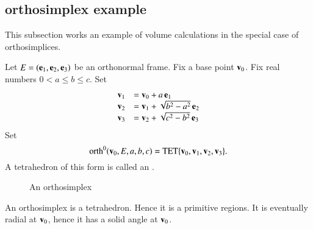 %
%
%



\subsection{orthosimplex example}
%

This subsection works an example of volume calculations in the special
case of orthosimplices.

\begin{definition}[orthosimplex]\label{def:orth}  Let
$E=({\mathbf e}_1,{\mathbf e}_2,{\mathbf e}_3)$ be an orthonormal frame.  Fix a base point ${\mathbf v}_0$.
Fix real numbers  $0<a\le b \le c$.  Set
$$
\begin{array}{lll}
{\mathbf v}_1 &= {\mathbf v}_0 + a \,{\mathbf e}_1\\
{\mathbf v}_2 &= {\mathbf v}_1 + \sqrt{b^2-a^2}\, {\mathbf e}_2\\
{\mathbf v}_3 &= {\mathbf v}_2 + \sqrt{c^2-b^2} \,{\mathbf e}_3\\
\end{array}
$$
Set 
$${\operatorname{orth}}^0({\mathbf v}_0,E,a,b,c)={\operatorname{TET}}\{{\mathbf v}_0,{\mathbf v}_1,{\mathbf v}_2,{\mathbf v}_3\}.$$
A tetrahedron of this form is called an .
\end{definition}

\begin{figure}[htb]
\centering
\caption{An orthosimplex}
\label{fig:rogers}
\end{figure}

An orthosimplex is a tetrahedron.  Hence it is a
primitive regions.  It is eventually radial at ${\mathbf v}_0$, hence
it has a solid angle at ${\mathbf v}_0$.  

